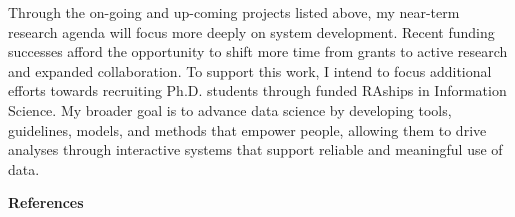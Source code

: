 \documentclass[11pt]{article}
\begin{document}
Through the on-going and up-coming projects listed above, my near-term research agenda will focus more deeply on system development. Recent funding successes afford the opportunity to shift more time from grants to active research and expanded collaboration.
To support this work, I intend to focus additional efforts towards recruiting Ph.D. students through funded RAships in Information Science.  
My broader goal 
is to advance 
data science by developing tools, guidelines, models, and methods that empower people, allowing them to drive analyses through interactive systems that support reliable and meaningful use of data.

\pagebreak
{
\vspace{4pt}
\noindent
\textbf{References}
\vspace{-24pt}
\renewcommand\refname{\vskip -1cm}
\footnotesize


}


\pagebreak
\setcounter{page}{1}
\end{document}
